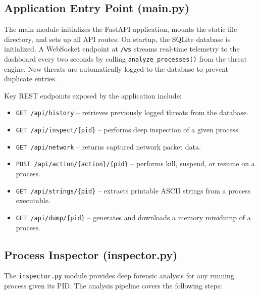 \subsection{Application Entry Point (main.py)}

The main module initializes the FastAPI application, mounts the static file directory, and sets up all API routes. On startup, the SQLite database is initialized. A WebSocket endpoint at \texttt{/ws} streams real-time telemetry to the dashboard every two seconds by calling \texttt{analyze\_processes()} from the threat engine. New threats are automatically logged to the database to prevent duplicate entries.

Key REST endpoints exposed by the application include:

\begin{itemize}
    \item \texttt{GET /api/history} -- retrieves previously logged threats from the database.
    \item \texttt{GET /api/inspect/\{pid\}} -- performs deep inspection of a given process.
    \item \texttt{GET /api/network} -- returns captured network packet data.
    \item \texttt{POST /api/action/\{action\}/\{pid\}} -- performs kill, suspend, or resume on a process.
    \item \texttt{GET /api/strings/\{pid\}} -- extracts printable ASCII strings from a process executable.
    \item \texttt{GET /api/dump/\{pid\}} -- generates and downloads a memory minidump of a process.
\end{itemize}

\subsection{Process Inspector (inspector.py)}

The \texttt{inspector.py} module provides deep forensic analysis for any running process given its PID. The analysis pipeline covers the following steps:

